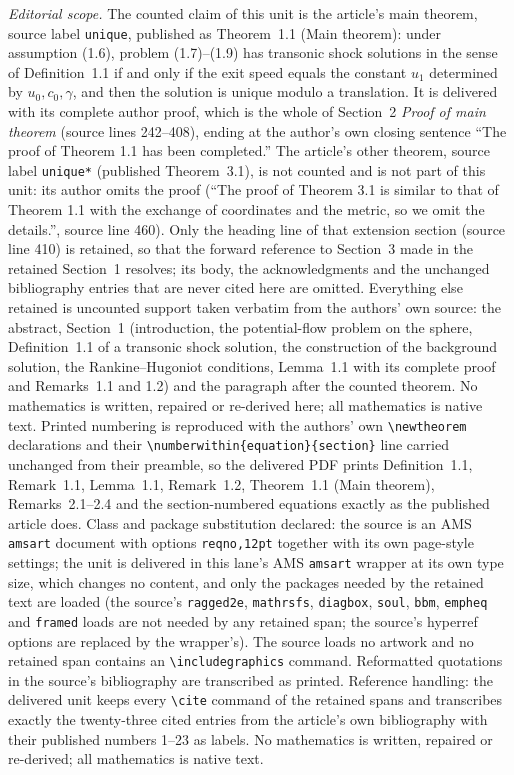 \documentclass[10pt,a4paper]{amsart}
\numberwithin{equation}{section}
\begin{document}
\noindent\textit{Editorial scope.} The counted claim of this unit is the article's main theorem, source label \texttt{unique}, published as Theorem~1.1 (Main theorem): under assumption (1.6), problem (1.7)--(1.9) has transonic shock solutions in the sense of Definition~1.1 if and only if the exit speed equals the constant $u_1$ determined by $u_0,c_0,\gamma$, and then the solution is unique modulo a translation. It is delivered with its complete author proof, which is the whole of Section~2 \emph{Proof of main theorem} (source lines 242--408), ending at the author's own closing sentence ``The proof of Theorem 1.1 has been completed.'' The article's other theorem, source label \texttt{unique*} (published Theorem~3.1), is not counted and is not part of this unit: its author omits the proof (``The proof of Theorem 3.1 is similar to that of Theorem 1.1 with the exchange of coordinates and the metric, so we omit the details.'', source line 460). Only the heading line of that extension section (source line 410) is retained, so that the forward reference to Section~3 made in the retained Section~1 resolves; its body, the acknowledgments and the unchanged bibliography entries that are never cited here are omitted. Everything else retained is uncounted support taken verbatim from the authors' own source: the abstract, Section~1 (introduction, the potential-flow problem on the sphere, Definition~1.1 of a transonic shock solution, the construction of the background solution, the Rankine--Hugoniot conditions, Lemma~1.1 with its complete proof and Remarks~1.1 and 1.2) and the paragraph after the counted theorem. No mathematics is written, repaired or re-derived here; all mathematics is native text. Printed numbering is reproduced with the authors' own \texttt{\textbackslash newtheorem} declarations and their \texttt{\textbackslash numberwithin\{equation\}\{section\}} line carried unchanged from their preamble, so the delivered PDF prints Definition~1.1, Remark~1.1, Lemma~1.1, Remark~1.2, Theorem~1.1 (Main theorem), Remarks~2.1--2.4 and the section-numbered equations exactly as the published article does. Class and package substitution declared: the source is an AMS \texttt{amsart} document with options \texttt{reqno,12pt} together with its own page-style settings; the unit is delivered in this lane's AMS \texttt{amsart} wrapper at its own type size, which changes no content, and only the packages needed by the retained text are loaded (the source's \texttt{ragged2e}, \texttt{mathrsfs}, \texttt{diagbox}, \texttt{soul}, \texttt{bbm}, \texttt{empheq} and \texttt{framed} loads are not needed by any retained span; the source's hyperref options are replaced by the wrapper's). The source loads no artwork and no retained span contains an \texttt{\textbackslash includegraphics} command. Reformatted quotations in the source's bibliography are transcribed as printed. Reference handling: the delivered unit keeps every \texttt{\textbackslash cite} command of the retained spans and transcribes exactly the twenty-three cited entries from the article's own bibliography with their published numbers 1--23 as labels. No mathematics is written, repaired or re-derived; all mathematics is native text.
\end{document}
